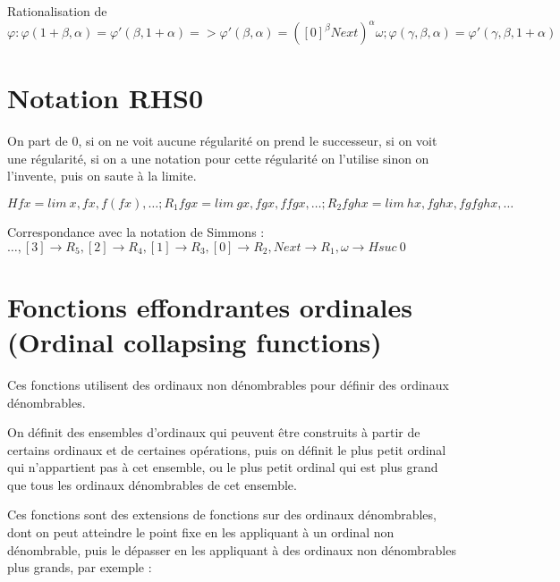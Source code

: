 \documentclass[8pt]{article}
\begin{document}
Rationalisation de \( \varphi : \varphi(1+\beta,\alpha) = \varphi'(\beta,1+\alpha) => \varphi'(\beta,\alpha) = ([0]^\beta Next)^\alpha \omega ; \varphi(\gamma,\beta,\alpha) = \varphi'(\gamma,\beta,1+\alpha) \) 

\vspace{-0.7cm}

\section{Notation RHS0}
\vspace{-0.4cm}
On part de 0, si on ne voit aucune régularité on prend le successeur, si on voit une régularité, si on a une notation pour cette régularité on l'utilise sinon on l'invente, puis on saute à la limite.

\( H f x = lim\ x, f x, f (f x), \ldots ; R_1 f g x = lim\ g x, f g x, f f g x, \ldots ; R_2 f g h x = lim\ h x, f g h x, f g f g h x, \ldots \)

Correspondance avec la notation de Simmons : 
\( \ldots, [3] \rightarrow R_5, [2] \rightarrow R_4, [1] \rightarrow R_3, [0] \rightarrow R_2, Next \rightarrow R_1, \omega \rightarrow H suc\ 0 \)

\vspace{-0.7cm}

\section{Fonctions effondrantes ordinales (Ordinal collapsing functions)}
\vspace{-0.4cm}
Ces fonctions utilisent des ordinaux non dénombrables pour définir des ordinaux dénombrables. 

On définit des ensembles d'ordinaux qui peuvent être construits à partir de certains ordinaux et de certaines opérations, puis on définit le plus petit ordinal qui n'appartient pas à cet ensemble, ou le plus petit ordinal qui est plus grand que tous les ordinaux dénombrables de cet ensemble.

Ces fonctions sont des extensions de fonctions sur des ordinaux dénombrables, dont on peut atteindre le point fixe en les appliquant à un ordinal non dénombrable, puis le dépasser en les appliquant à des ordinaux non dénombrables plus grands, par exemple : 
\end{document}
